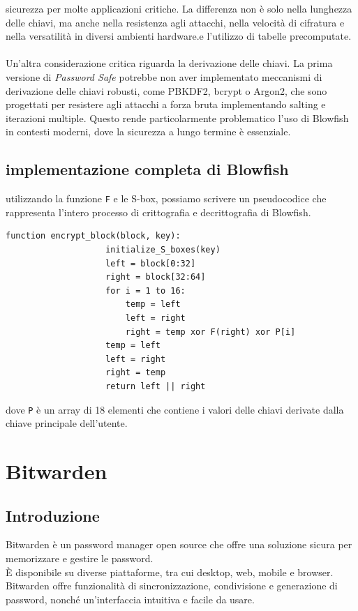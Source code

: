 \documentclass[a4paper,12pt]{report}
\begin{document}
			sicurezza per molte applicazioni critiche. La differenza non è solo
			nella lunghezza delle chiavi, ma anche nella resistenza agli attacchi,
			nella velocità di cifratura e nella versatilità in diversi ambienti
			hardware.e l'utilizzo di tabelle precomputate.\\\\
			Un'altra considerazione critica riguarda la derivazione delle chiavi. La prima
			versione di \textit{Password Safe} potrebbe non aver implementato meccanismi di
			derivazione delle chiavi robusti, come PBKDF2, bcrypt o Argon2, che sono
			progettati per resistere agli attacchi a forza bruta implementando salting e
			iterazioni multiple. Questo rende particolarmente problematico l'uso di Blowfish
			in contesti moderni, dove la sicurezza a lungo termine è essenziale.\\
			\section*{implementazione completa di Blowfish}
			utilizzando la funzione \texttt{F} e le S-box, possiamo scrivere un
			pseudocodice che rappresenta l'intero processo di crittografia e
			decrittografia di Blowfish.
			\begin{lstlisting}[style=pseudocode]
				function encrypt_block(block, key):
					initialize_S_boxes(key)
					left = block[0:32]
					right = block[32:64]
					for i = 1 to 16:
						temp = left
						left = right
						right = temp xor F(right) xor P[i]
					temp = left
					left = right
					right = temp
					return left || right
			\end{lstlisting}
			dove \texttt{P} è un array di 18 elementi che contiene i valori delle chiavi
			derivate dalla chiave principale dell'utente.\\
	\chapter{Bitwarden}
		\section{Introduzione}
		Bitwarden è un password manager open source che offre una soluzione sicura
		per memorizzare e gestire le password.\\ È disponibile su diverse piattaforme,
		tra cui desktop, web, mobile e browser. Bitwarden offre funzionalità di
		sincronizzazione, condivisione e generazione di password, nonché un'interfaccia
		intuitiva e facile da usare.\\
		
\end{document}
